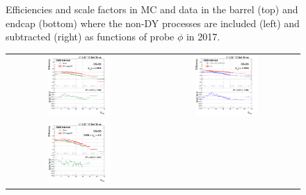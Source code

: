 \begin{figure}[htp]
\begin{center}
\begin{tabular}{cc}
    \end{tabular}
    \caption{Efficiencies and scale factors in MC and data in the barrel (top) and endcap (bottom) where the non-DY processes are included (left) and subtracted (right) as functions of probe $\phi$ in 2017.}
    \label{fig:eff_SS_nominal_phi_2017}
  \end{center}
\end{figure}

\begin{figure}[bh]
  \begin{center}
    \begin{tabular}{cc}
      \includegraphics[width=0.45\textwidth]{figures/Zprime/2017/ScaleFactor/SameSign/nominal/g_compare_cut_nVtx_Barrel_ea_ta_inc_AS_nominal_PUW.png} &
      \includegraphics[width=0.45\textwidth]{figures/Zprime/2017/ScaleFactor/SameSign/nominal/g_compare_cut_nVtx_Barrel_ea_ta_exc_AS_nominal_PUW.png} \\
      \includegraphics[width=0.45\textwidth]{figures/Zprime/2017/ScaleFactor/SameSign/nominal/g_compare_cut_nVtx_Endcap_ea_ta_inc_AS_nominal_PUW.png} &

\end{tabular}
\end{center}
\end{figure}
